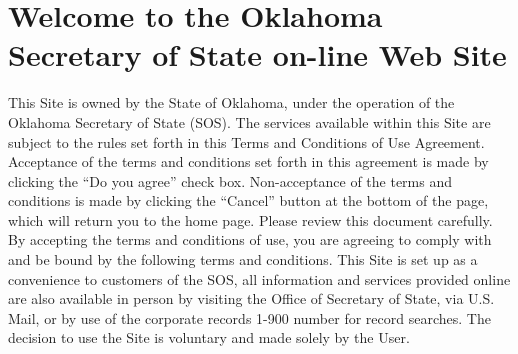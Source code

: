\section{Welcome to the Oklahoma Secretary of State on-line Web Site}
This Site is owned by the State of Oklahoma, under the operation of the Oklahoma
Secretary of State (SOS). The services available within this Site are subject to
the rules set forth in this Terms and Conditions of Use Agreement. Acceptance of
the terms and conditions set forth in this agreement is made by clicking the
``Do you agree'' check box. Non-acceptance of the terms and conditions is made
by clicking the ``Cancel'' button at the bottom of the page, which will return
you to the home page. Please review this document carefully. By accepting the
terms and conditions of use, you are agreeing to comply with and be bound by the
following terms and conditions. This Site is set up as a convenience to
customers of the SOS, all information and services provided online are also
available in person by visiting the Office of Secretary of State, via U.S. Mail,
or by use of the corporate records 1-900 number for record searches. The
decision to use the Site is voluntary and made solely by the User.